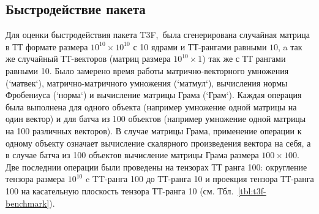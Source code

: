 \subsection{Быстродействие пакета}
Для оценки быстродействия пакета T3F, была сгенерирована случайная матрица в ТТ формате размера $10^{10} \times 10^{10}$ с 10 ядрами и ТТ-рангами равными $10$, a так же случайный ТТ-векторов (матриц размера $10^{10} \times 1$) так же с ТТ рангами равными 10. Было замерено время работы матрично-векторного умножения (`матвек`), матрично-матричного умножения (`матмул`), вычисления нормы Фробениуса (`норма`) и вычисление матрицы Грама (`Грам`). Каждая операция была выполнена для одного объекта (например умножение одной матрицы на один вектор) и для батча из 100 объектов (например умножение одной матрицы на 100 различных векторов). В случае матрицы Грама, применение операции к одному объекту означает вычисление скалярного произведения вектора на себя, а в случае батча из 100 объектов вычисление матрицы Грама размера $100 \times 100$. Две последнии операции были проведены на тензорах ТТ ранга 100: округление тензора размера $10^{10}$ c TT-ранга 100 до ТТ-ранга 10 и проекция тензора ТТ-ранга 100 на касательную плоскость тензора ТТ-ранга 10 (см. Тбл.~\ref{tbl:t3f-benchmark}).
